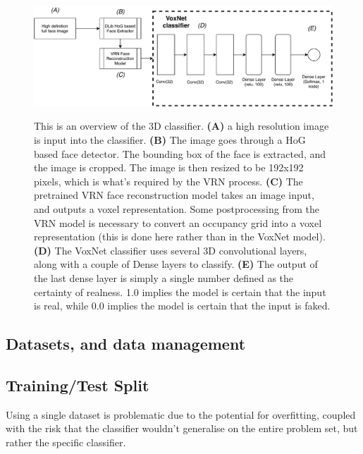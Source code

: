 \documentclass[10pt,a4paper]{article}
\begin{document}
            \begin{figure}
                \centering
                \includegraphics[width=\linewidth]{voxnet.pdf}
                \label{3DClassifierArchitectureDiagram}
                \caption{
                    This is an overview of the 3D classifier. \textbf{(A)} a high resolution image is input into the classifier. \textbf{(B)} The image goes through a HoG based face detector. The bounding box of the face is extracted, and the image is cropped. 
                    The image is then resized to be 192x192 pixels, which is what's required by the VRN process.
                    \textbf{(C)} The pretrained VRN face reconstruction model takes an image input, and outputs a voxel representation. Some postprocessing from the VRN model 
                    is necessary to convert an occupancy grid into a voxel representation (this is done here rather than in the VoxNet model).
                    \textbf{(D)} The VoxNet classifier uses several 3D convolutional layers, along with a couple of Dense layers to classify.
                    \textbf{(E)} The output of the last dense layer is simply a single number defined as the certainty of realness. 1.0 implies the model is certain that the input is real, while 0.0 implies the model is certain that the input is faked.
                }
            \end{figure}

    \subsection{Datasets, and data management}

        \subsection{Training/Test Split}
            Using a single dataset is problematic due to the potential for overfitting, coupled with the risk that the classifier wouldn't generalise on the entire problem set, but rather the specific classifier.
            
\end{document}

